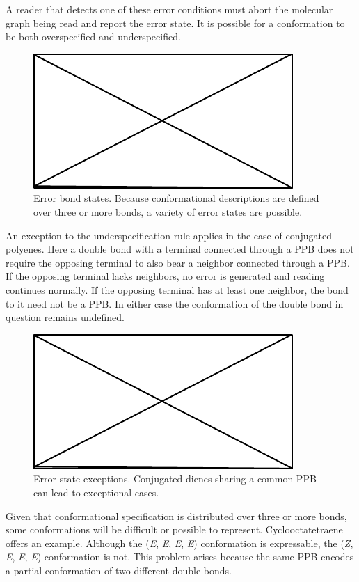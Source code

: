 \documentclass{article}
\begin{document}
A reader that detects one of these error conditions must abort the molecular graph being read and report the error state. It is possible for a conformation to be both overspecified and underspecified.

\begin{figure}
    \centering
    \includegraphics{filler}
    \caption{Error bond states. Because conformational descriptions are defined over three or more bonds, a variety of error states are possible.}
    \label{fig:bond-error-states}
\end{figure}

An exception to the underspecification rule applies in the case of conjugated polyenes. Here a double bond with a terminal connected through a PPB does not require the opposing terminal to also bear a neighbor connected through a PPB. If the opposing terminal lacks neighbors, no error is generated and reading continues normally. If the opposing terminal has at least one neighbor, the bond to it need not be a PPB. In either case the conformation of the double bond in question remains undefined.

\begin{figure}
    \centering
    \includegraphics{filler}
    \caption{Error state exceptions. Conjugated dienes sharing a common PPB can lead to exceptional cases.}
    \label{fig:bond-error-state-exceptions}
\end{figure}

Given that conformational specification is distributed over three or more bonds, some conformations will be difficult or possible to represent. Cyclooctatetraene offers an example. Although the (\textit{E}, \textit{E}, \textit{E}, \textit{E}) conformation is expressable, the (\textit{Z}, \textit{E}, \textit{E}, \textit{E}) conformation is not. This problem arises because the same PPB encodes a partial conformation of two different double bonds.
\end{document}
